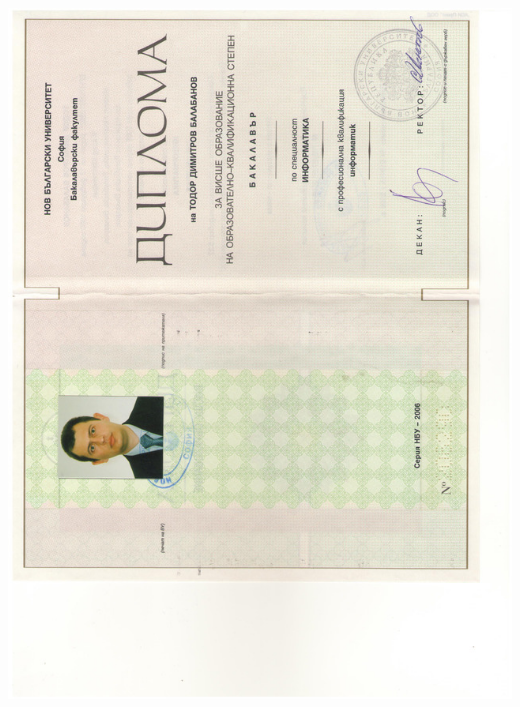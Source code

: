 \documentclass[english,a4paper]{europasscv}
\begin{document}
\includegraphics[width=\textwidth,height=\textheight,keepaspectratio]{DiplomaNBU2006_2}
\end{document}
